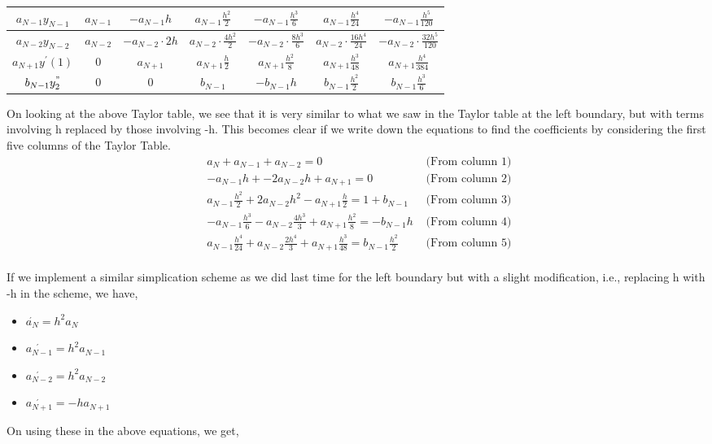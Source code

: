 \documentclass[letterpaper]{exam}
\begin{document}
\begin{questions}
\begin{parts}
\begin{solution}
\begin{center}
\begin{tabular}{|c|c|c|c|c|c|c|}
     $a_{N-1}y_{N-1}$&$a_{N-1}$&$-a_{N-1}h$&$a_{N-1}\frac{h^2}{2}$&$-a_{N-1}\frac{h^3}{6}$&$a_{N-1}\frac{h^4}{24}$&$-a_{N-1}\frac{h^5}{120}$\\
\hline
     $a_{N-2}y_{N-2}$&$a_{N-2}$&$-a_{N-2}\cdot2h$&$a_{N-2}\cdot\frac{4h^2}{2}$&$-a_{N-2}\cdot\frac{8h^3}{6}$&$a_{N-2}\cdot\frac{16h^4}{24}$&$-a_{N-2}\cdot\frac{32h^5}{120}$\\
\hline
     $a_{N+1}y^{'}(1)$&0&$a_{N+1}$&$a_{N+1}\frac{h}{2}$&$a_{N+1}\frac{h^2}{8}$&$a_{N+1}\frac{h^3}{48}$&$a_{N+1}\frac{h^4}{384}$\\
\hline
     $b_{N-1}y_{2}^{"}$&0&0&$b_{N-1}$&$-b_{N-1}h$&$b_{N-1}\frac{h^2}{2}$&$b_{N-1}\frac{h^3}{6}$\\
\hline
\end{tabular}
\end{center}
On looking at the above Taylor table, we see that it is very similar to what we saw in the Taylor table at the left boundary, but with terms involving h replaced by those involving -h. This becomes clear if we write down the equations to find the coefficients by considering the first five columns of the Taylor Table.\\
\begin{align*}
    &a_{N} + a_{N-1} + a_{N-2} = 0 &\mbox{ (From column 1) }\\
    &-a_{N-1}h + -2a_{N-2}h + a_{N+1} = 0 &\mbox{ (From column 2)}\\
    &a_{N-1}\frac{h^2}{2} + 2a_{N-2}h^2 - a_{N+1}\frac{h}{2}  = 1 +b_{N-1} &\mbox{ (From column 3)}\\
    &-a_{N-1}\frac{h^3}{6} - a_{N-2}\frac{4h^3}{3} + a_{N+1}\frac{h^2}{8} = -b_{N-1}h &\mbox{ (From column 4)}\\
    &a_{N-1}\frac{h^4}{24} + a_{N-2}\frac{2h^4}{3} + a_{N+1}\frac{h^3}{48}= b_{N-1}\frac{h^2}{2} &\mbox{ (From column 5)}
\end{align*}
\\
If we implement a similar simplication scheme as we did last time for the left boundary but with a slight modification, i.e., replacing h with -h in the scheme, we have,
\begin{itemize}
    \item $\acute{a_{N}} = h^2a_{N}$
    \item $\acute{a_{N-1}} = h^2a_{N-1}$
    \item $\acute{a_{N-2}} = h^2a_{N-2}$
    \item $\acute{a_{N+1}} = -ha_{N+1}$
\end{itemize}
On using these in the above equations, we get,

\end{solution}
\end{parts}
\end{questions}
\end{document}
